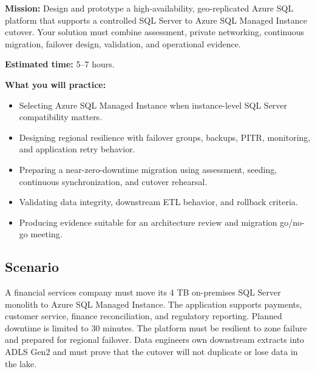 \begin{capstonebox}
\textbf{Mission:} Design and prototype a high-availability, geo-replicated Azure SQL platform that supports a controlled SQL Server to Azure SQL Managed Instance cutover. Your solution must combine assessment, private networking, continuous migration, failover design, validation, and operational evidence.

\textbf{Estimated time:} 5--7 hours.

\textbf{What you will practice:}
\begin{itemize}
    \item Selecting Azure SQL Managed Instance when instance-level SQL Server compatibility matters.
    \item Designing regional resilience with failover groups, backups, PITR, monitoring, and application retry behavior.
    \item Preparing a near-zero-downtime migration using assessment, seeding, continuous synchronization, and cutover rehearsal.
    \item Validating data integrity, downstream ETL behavior, and rollback criteria.
    \item Producing evidence suitable for an architecture review and migration go/no-go meeting.
\end{itemize}
\end{capstonebox}

\subsection*{Scenario}
A financial services company must move its 4 TB on-premises SQL Server monolith to Azure SQL Managed Instance. The application supports payments, customer service, finance reconciliation, and regulatory reporting. Planned downtime is limited to 30 minutes. The platform must be resilient to zone failure and prepared for regional failover. Data engineers own downstream extracts into ADLS Gen2 and must prove that the cutover will not duplicate or lose data in the lake.

